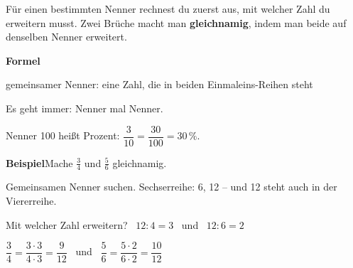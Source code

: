 \documentclass[11pt]{article}
\makeatletter
\newlength{\kr}
\newcommand{\karomerk}[2]{\protected@write\@auxout{}{\string\karoseite{#1}{#2}{\thepage}}}
\newcommand{\karoseite}[3]{\expandafter\xdef\csname karo@#1@#2\endcsname{#3}}
\makeatother
\begin{document}
\medskip
\par\vspace{3mm}\setlength{\kr}{\dimexpr\pagegoal-\pagetotal-10mm\relax}%
\ifdim\kr>12mm\karomerk{k}{B}\noindent{\scriptsize\color{mbgrau}Platz zum Rechnen}\par\nointerlineskip\vspace{1mm}\noindent
\begin{tikzpicture}\clip (0,0) rectangle ({\linewidth-0.5mm},\kr);\draw[black!16,line width=0.3pt,step=5mm] (0,0) grid (\linewidth,\kr);\end{tikzpicture}\fi\par
\clearpage\label{s:C}\noindent\colorbox{black!12}{}\hspace{3mm}{\Large\bfseries Auf einen gemeinsamen Nenner bringen}\par\smallskip
\noindent Für einen bestimmten Nenner rechnest du zuerst aus, mit welcher Zahl du erweitern musst. Zwei Brüche macht man \textbf{gleichnamig}, indem man beide auf denselben Nenner erweitert.\par\medskip
\noindent\textbf{Formel}\par\nopagebreak\noindent\hspace*{4mm}\begin{minipage}{\dimexpr\linewidth-4mm\relax}gemeinsamer Nenner: eine Zahl, die in beiden Einmaleins-Reihen steht \par {\small Es geht immer: Nenner mal Nenner.} \par\smallskip Nenner 100 heißt Prozent: $\dfrac{3}{10} = \dfrac{30}{100} = 30\,\%$.\end{minipage}\par\medskip
\noindent\textbf{Beispiel}\quad Mache $\frac{3}{4}$ und $\frac{5}{6}$ gleichnamig.\par\smallskip
\noindent\par\noindent{}Gemeinsamen Nenner suchen. Sechserreihe: 6, 12 – und 12 steht auch in der Viererreihe.\par\smallskip\par\noindent{}Mit welcher Zahl erweitern? \ $12 : 4 = 3$ \ und \ $12 : 6 = 2$\par\smallskip\par\noindent{}$\dfrac{3}{4} = \dfrac{3 \cdot 3}{4 \cdot 3} = \dfrac{9}{12}$ \ und \ $\dfrac{5}{6} = \dfrac{5 \cdot 2}{6 \cdot 2} = \dfrac{10}{12}$\par\smallskip\par\medskip
\end{document}
